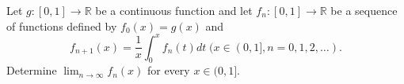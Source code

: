\documentclass{article}
\begin{document}
\setlength{\parindent}{0pt}
Let $g:[0,1]\to\mathbb{R}$ be a continuous function and let $f_{n}:[0,1]\to\mathbb{R}$ be a sequence of functions defined by $f_{0}(x)=g(x)$ and$$f_{n+1}(x)=\frac{1}{x}\int_{0}^{x}f_{n}(t)dt\;(x\in(0,1],n=0,1,2,\dots).$$Determine $\lim_{n\to\infty}f_{n}(x)$ for every $x\in(0,1]$.
\end{document}
